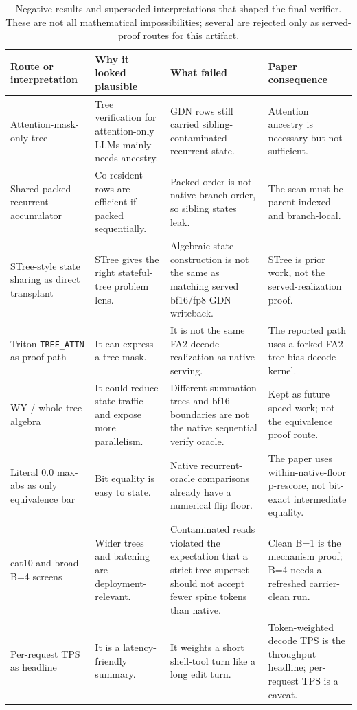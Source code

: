 \documentclass[conference]{IEEEtran}
\newcommand{\code}[1]{\texttt{#1}}
\newcommand{\rowsep}{\specialrule{0.15pt}{1.2pt}{1.2pt}}
\begin{document}
\begin{table}[t]
\caption{Negative results and superseded interpretations that shaped the final verifier. These are not all mathematical impossibilities; several are rejected only as served-proof routes for this artifact.}
\label{tab:negative}
\centering
\scriptsize
\begin{adjustbox}{width=\textwidth}
\begin{tabular}{L{0.18\textwidth} L{0.25\textwidth} L{0.28\textwidth} L{0.19\textwidth}}
\toprule
Route or interpretation & Why it looked plausible & What failed & Paper consequence \\
\midrule
Attention-mask-only tree & Tree verification for attention-only LLMs mainly needs ancestry. & GDN rows still carried sibling-contaminated recurrent state. & Attention ancestry is necessary but not sufficient. \\
\rowsep
Shared packed recurrent accumulator & Co-resident rows are efficient if packed sequentially. & Packed order is not native branch order, so sibling states leak. & The scan must be parent-indexed and branch-local. \\
\rowsep
STree-style state sharing as direct transplant & STree gives the right stateful-tree problem lens. & Algebraic state construction is not the same as matching served bf16/fp8 GDN writeback. & STree is prior work, not the served-realization proof. \\
\rowsep
Triton \code{TREE\_ATTN} as proof path & It can express a tree mask. & It is not the same FA2 decode realization as native serving. & The reported path uses a forked FA2 tree-bias decode kernel. \\
\rowsep
WY / whole-tree algebra & It could reduce state traffic and expose more parallelism. & Different summation trees and bf16 boundaries are not the native sequential verify oracle. & Kept as future speed work; not the equivalence proof route. \\
\rowsep
Literal \(0.0\) max-abs as only equivalence bar & Bit equality is easy to state. & Native recurrent-oracle comparisons already have a numerical flip floor. & The paper uses within-native-floor p-rescore, not bit-exact intermediate equality. \\
\rowsep
cat10 and broad B=4 screens & Wider trees and batching are deployment-relevant. & Contaminated reads violated the expectation that a strict tree superset should not accept fewer spine tokens than native. & Clean B=1 is the mechanism proof; B=4 needs a refreshed carrier-clean run. \\
\rowsep
Per-request TPS as headline & It is a latency-friendly summary. & It weights a short shell-tool turn like a long edit turn. & Token-weighted decode TPS is the throughput headline; per-request TPS is a caveat. \\
\bottomrule
\end{tabular}
\end{adjustbox}
\end{table}
\end{document}
